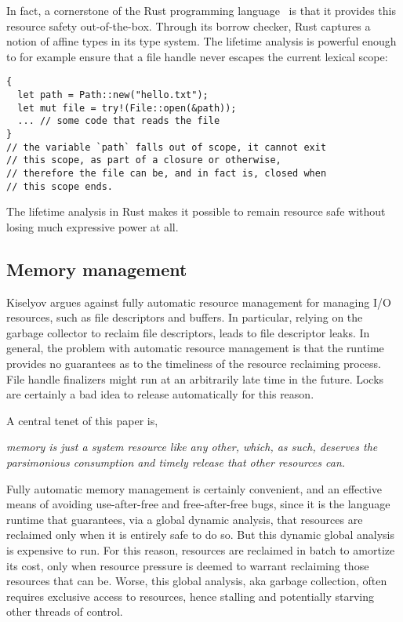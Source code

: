 \documentclass[11pt]{article}
\begin{document}
In fact, a cornerstone of the Rust programming
language~\cite{matsakis_rust_2014} is that it provides this resource
safety out-of-the-box. Through its borrow checker, Rust captures a
notion of affine types in its type system. The lifetime analysis is
powerful enough to for example ensure that a file handle never escapes
the current lexical scope:

\begin{verbatim}
{
  let path = Path::new("hello.txt");
  let mut file = try!(File::open(&path));
  ... // some code that reads the file
}
// the variable `path` falls out of scope, it cannot exit
// this scope, as part of a closure or otherwise,
// therefore the file can be, and in fact is, closed when
// this scope ends.
\end{verbatim}

The lifetime analysis in Rust makes it possible to remain resource
safe without losing much expressive power at all.

\subsection{Memory management}

Kiselyov \cite{kiselyov_iteratees_2012} argues against fully automatic
resource management for managing I/O resources, such as file
descriptors and buffers. In particular, relying on the garbage
collector to reclaim file descriptors, leads to file descriptor leaks.
In general, the problem with automatic resource management is that the
runtime provides no guarantees as to the timeliness of the resource
reclaiming process. File handle finalizers might run at an arbitrarily
late time in the future. Locks are certainly a bad idea to release
automatically for this reason.

A central tenet of this paper is,
\begin{center}
\em memory is just a system resource like any other, which, as such,
deserves the parsimonious consumption and timely release that other
resources can.
\end{center}
Fully automatic memory management is certainly convenient, and an
effective means of avoiding use-after-free and free-after-free bugs,
since it is the language runtime that guarantees, via a global dynamic
analysis, that resources are reclaimed only when it is entirely safe
to do so. But this dynamic global analysis is expensive to run. For
this reason, resources are reclaimed in batch to amortize its cost,
only when resource pressure is deemed to warrant reclaiming those
resources that can be. Worse, this global analysis, aka garbage
collection, often requires exclusive access to resources, hence
stalling and potentially starving other threads of control.
\end{document}
